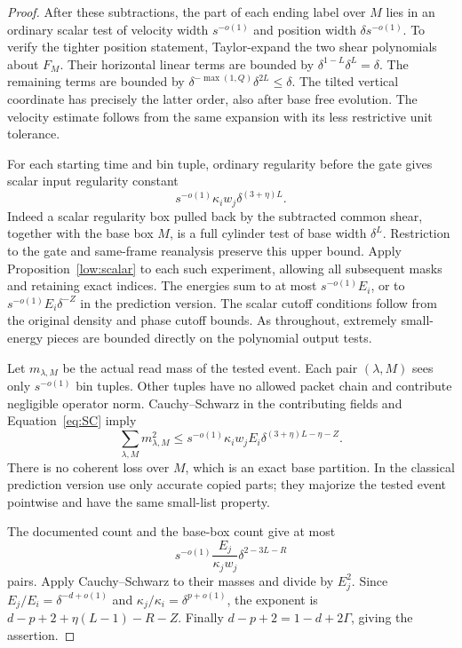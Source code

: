 \begin{proof}
After these subtractions, the part of each ending label over $M$ lies
in an ordinary scalar test of velocity width $s^{-o(1)}$ and position
width $\delta s^{-o(1)}$. To verify the tighter position statement,
Taylor-expand the two shear polynomials about $F_M$. Their horizontal
linear terms are bounded by
$\delta^{1-L}\delta^L=\delta$. The remaining terms are bounded by
$\delta^{-\max(1,Q)}\delta^{2L}\leq\delta$.
The tilted vertical coordinate has precisely the latter order, also
after base free evolution. The velocity estimate follows from the
same expansion with its less restrictive unit tolerance.

For each starting time and bin tuple, ordinary regularity before the
gate gives scalar input regularity constant
\[
 s^{-o(1)}\kappa_i w_j\delta^{(3+\eta)L}.
\]
Indeed a scalar regularity box pulled back by the subtracted common
shear, together with the base box $M$, is a full cylinder test of base
width $\delta^L$. Restriction to the gate and same-frame reanalysis
preserve this upper bound. Apply Proposition~\ref{low:scalar} to each
such experiment, allowing all subsequent masks and retaining exact
indices. The energies sum to at most $s^{-o(1)}E_i$, or to
$s^{-o(1)}E_i\delta^{-Z}$ in the prediction version. The scalar cutoff
conditions follow from the original density and phase cutoff bounds.
As throughout, extremely small-energy pieces are bounded directly on
the polynomial output tests.

Let $m_{\lambda,M}$ be the actual read mass of the tested event.
Each pair $(\lambda,M)$ sees only $s^{-o(1)}$ bin tuples. Other tuples
have no allowed packet chain and contribute negligible operator norm.
Cauchy--Schwarz in the contributing fields and
Equation~\eqref{eq:SC} imply
\[
 \sum_{\lambda,M}m_{\lambda,M}^2
 \leq s^{-o(1)}\kappa_iw_jE_i
                    \delta^{(3+\eta)L-\eta-Z}.
\]
There is no coherent loss over $M$, which is an exact base partition.
In the classical prediction version use only accurate copied parts;
they majorize the tested event pointwise and have the same small-list
property.

The documented count and the base-box count give at most
\[
 s^{-o(1)}\frac{E_j}{\kappa_jw_j}
                        \delta^{2-3L-R}
\]
pairs. Apply Cauchy--Schwarz to their masses and divide by $E_j^2$.
Since $E_j/E_i=\delta^{-d+o(1)}$ and
$\kappa_j/\kappa_i=\delta^{p+o(1)}$, the exponent is
$d-p+2+\eta(L-1)-R-Z$. Finally
$d-p+2=1-d+2\Gamma$, giving the assertion.
\end{proof}

